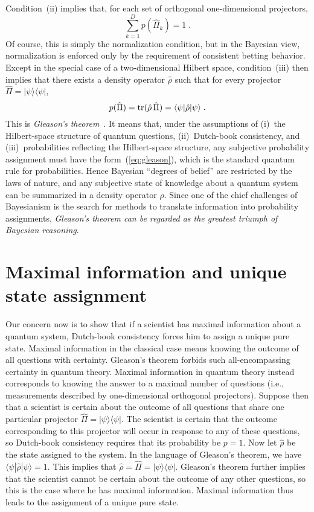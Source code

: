 \documentclass[aps,12pt]{revtex4}
\begin{document}
Condition~(ii) implies that, for each set of orthogonal
one-dimensional projectors,
\begin{equation}
\sum_{k=1}^D p(\hat\Pi_k) = 1 \;.
\end{equation}
Of course, this is simply the normalization condition, but in the
Bayesian view, normalization is enforced only by the requirement of
consistent betting behavior.  Except in the special case of a
two-dimensional Hilbert space, condition~(iii) then implies that
there exists a density operator $\hat\rho$ such that for every
projector $\hat\Pi=|\psi\rangle\langle\psi|$,
\begin{equation}
p(\hat\Pi)={\rm tr}(\hat\rho\,\hat\Pi)=\langle\psi|\hat\rho|\psi\rangle \;.
\label{eq:gleason}
\end{equation}
This is {\it Gleason's theorem}~\cite{Gleason57}. It means that,
under the assumptions of (i)~the Hilbert-space structure of quantum
questions, (ii)~Dutch-book consistency, and (iii)~probabilities
reflecting the Hilbert-space structure, any subjective probability
assignment must have the form~(\ref{eq:gleason}), which is the
standard quantum rule for probabilities.  Hence Bayesian ``degrees of
belief'' are restricted by the laws of nature, and any subjective
state of knowledge about a quantum system can be summarized in a
density operator $\hat\rho$.  Since one of the chief challenges of
Bayesianism is the search for methods to translate information into
probability assignments, {\it Gleason's theorem can be regarded as
the greatest triumph of Bayesian reasoning}.

\section{Maximal information and unique state assignment} \label{sec:unique}

Our concern now is to show that if a scientist has maximal
information about a quantum system, Dutch-book consistency forces him
to assign a unique pure state.  Maximal information in the classical
case means knowing the outcome of all questions with certainty.
Gleason's theorem forbids such all-encompassing certainty in quantum
theory.  Maximal information in quantum theory instead corresponds to
knowing the answer to a maximal number of questions (i.e.,
measurements described by one-dimensional orthogonal projectors).
Suppose then that a scientist is certain about the outcome of all
questions that share one particular projector
$\hat\Pi=|\psi\rangle\langle\psi|$. The scientist is certain that the
outcome corresponding to this projector will occur in response to any
of these questions, so Dutch-book consistency requires that its
probability be $p=1$.  Now let $\hat\rho$ be the state assigned to
the system.  In the language of Gleason's theorem, we have
$\langle\psi|\hat\rho|\psi\rangle=1$. This implies that
$\hat\rho=\hat\Pi=|\psi\rangle\langle\psi|$. Gleason's theorem
further implies that the scientist cannot be certain about the
outcome of any other questions, so this is the case where he has
maximal information.  Maximal information thus leads to the
assignment of a unique pure state.
\end{document}
